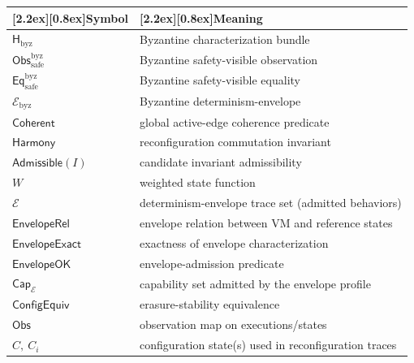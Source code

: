 \documentclass[a4paper,10pt,twocolumn,english]{article}
\numberwithin{equation}{section}
\theoremstyle{paperdef}
\theoremstyle{paperplain}
\theoremstyle{paperdef}
\theoremstyle{paperremark}
\theoremstyle{paperdef}
\newcommand{\thead}[1]{\textbf{\raisebox{0pt}[2.2ex][0.8ex]{#1}}}
\newcommand{\Hbyz}{\ensuremath{\mathsf{H}_{\mathrm{byz}}}}
\newcommand{\Obssafe}{\ensuremath{\mathsf{Obs}_{\mathrm{safe}}^{\mathrm{byz}}}}
\newcommand{\Eqsafe}{\ensuremath{\mathsf{Eq}_{\mathrm{safe}}^{\mathrm{byz}}}}
\newcommand{\Ebyz}{\ensuremath{\mathcal{E}_{\mathrm{byz}}}}
\newcommand{\Coherent}{\ensuremath{\mathsf{Coherent}}}
\newcommand{\Harmony}{\ensuremath{\mathsf{Harmony}}}
\newcommand{\Admissible}{\ensuremath{\mathsf{Admissible}}}
\newcommand{\EnvelopeRel}{\ensuremath{\mathsf{EnvelopeRel}}}
\newcommand{\EnvelopeExact}{\ensuremath{\mathsf{EnvelopeExact}}}
\newcommand{\EnvelopeOK}{\ensuremath{\mathsf{EnvelopeOK}}}
\newcommand{\ConfigEquiv}{\ensuremath{\mathsf{ConfigEquiv}}}
\newcommand{\Obs}{\ensuremath{\mathsf{Obs}}}
\begin{document}
\begin{table}[H]
	\centering
	\footnotesize
	\begin{tabularx}{\columnwidth}{@{}L{0.34\columnwidth}L{0.61\columnwidth}@{}}
		\toprule
		\thead{Symbol}               & \thead{Meaning}                                                  \\
		\midrule
		\Hbyz                        & Byzantine characterization bundle                                \\
		\Obssafe                     & Byzantine safety-visible observation                             \\
		\Eqsafe                      & Byzantine safety-visible equality                                \\
		\Ebyz                        & Byzantine determinism-envelope                                   \\
		\Coherent                    & global active-edge coherence predicate                           \\
		\Harmony                     & reconfiguration commutation invariant                            \\
		$\Admissible(I)$             & candidate invariant admissibility                                \\
		$W$                          & weighted state function                                          \\
		$\mathcal{E}$                & determinism-envelope trace set (admitted behaviors)              \\
		\EnvelopeRel                 & envelope relation between VM and reference states                \\
		\EnvelopeExact               & exactness of envelope characterization                           \\
		\EnvelopeOK                  & envelope-admission predicate                                     \\
		$\mathsf{Cap}_{\mathcal{E}}$ & capability set admitted by the envelope profile                  \\
		\ConfigEquiv{}               & erasure-stability equivalence                                    \\
		\Obs                         & observation map on executions/states                             \\
		$C,\ C_i$                    & configuration state(s) used in reconfiguration traces            \\

\end{tabularx}
\end{table}
\end{document}
